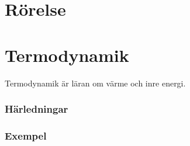 \documentclass[12pt, a4paper]{article}
\theoremstyle{definition}
\begin{document}
    \part{Rörelse}
    

    \part{Termodynamik}
    Termodynamik är läran om värme och inre energi.
    

    \newpage
    \appendix
    \section{Härledningar}
    \label{appendix:härledning}
    
    \section{Exempel}
    \label{appendix:exempel}
\end{document}
